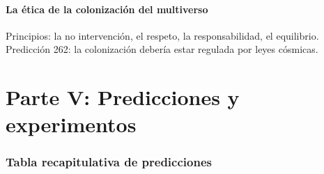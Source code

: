 \documentclass[11pt,a4paper]{article}
\begin{document}
\subsection{La ética de la colonización del multiverso}
Principios: la no intervención, el respeto, la responsabilidad, el equilibrio. Predicción 262: la colonización debería estar regulada por leyes cósmicas.

\newpage
\part*{Parte V: Predicciones y experimentos}

\section{Tabla recapitulativa de predicciones}
\end{document}
